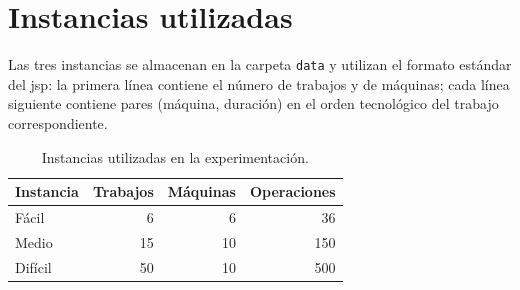 \section{Instancias utilizadas}

Las tres instancias se almacenan en la carpeta \texttt{data} y utilizan el formato estándar del \gls{jsp}:
la primera línea contiene el número de trabajos y de máquinas;
cada línea siguiente contiene pares (máquina, duración) en el orden tecnológico del trabajo correspondiente.

\begin{table}[htbp]
\centering
\caption{Instancias utilizadas en la experimentación.}
\label{tab:instancias}
\begin{tabular}{lrrr}
\toprule
Instancia & Trabajos & Máquinas & Operaciones \\
\midrule
Fácil   & 6  & 6  & 36 \\
Medio   & 15 & 10 & 150 \\
Difícil & 50 & 10 & 500 \\
\bottomrule
\end{tabular}
\end{table}
